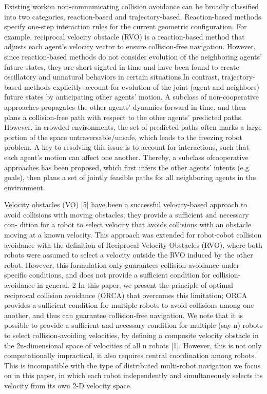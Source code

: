\documentclass[12pt]{report}
\begin{document}
Existing  workon non-communicating collision avoidance can be broadly classified into two categories, reaction-based and trajectory-based.  Reaction-based  methods specify  one-step interaction rules for the current geometric configuration. For example, reciprocal velocity obstacle (RVO) is a reaction-based method that adjusts each  agent’s velocity vector to ensure collision-free navigation. However, since reaction-based methods do not consider evolution of the neighboring agents’ future states, they are short-sighted in time and have been found to create oscillatory and unnatural behaviors in certain situations.In contrast, trajectory-based methods  explicitly account for evolution of the joint (agent and neighbors) future states by  anticipating other agents’ motion. A subclass of non-cooperative approaches propagates the other agents’ dynamics forward in time, and then plans a collision-free path with respect to the other agents’ predicted paths. However, in crowded environments,  the set of predicted paths often marks a large portion of the space untraversable/unsafe, which leads to the freezing robot problem. A key to resolving this issue is to  account for interactions, such that each agent’s motion can affect one another. Thereby, a subclass ofcooperative approaches has been proposed, which first infers the other agents’ intents (e.g. goals), then plans a set of jointly feasible paths for all  neighboring agents in the environment.

Velocity obstacles (VO) [5] have been a successful velocity-based approach to
avoid collisions with moving obstacles; they provide a sufficient and necessary con-
dition for a robot to select velocity that avoids collisions with an obstacle moving at
a known velocity. This approach was extended for robot-robot collision avoidance
with the definition of Reciprocal Velocity Obstacles (RVO), where both
robots were assumed to select a velocity outside the RVO induced by the other robot.
However, this formulation only guarantees collision-avoidance under specific conditions, and does not provide a sufficient condition for collision-avoidance in general. 2 In this paper, we present the principle of optimal reciprocal collision avoidance (ORCA) that overcomes this limitation; ORCA provides a sufficient condition for multiple robots to avoid collisions among one another, and thus can guarantee collision-free navigation.
We note that it is possible to provide a sufficient and necessary condition for
multiple (say n) robots to select collision-avoiding velocities, by defining a composite velocity obstacle in the 2n-dimensional space of velocities of all n robots [1]. However, this is not only computationally impractical, it also requires central coordination among robots. This is incompatible with the type of distributed multi-robot navigation we focus on in this paper, in which each robot independently and simultaneously selects its velocity from its own 2-D velocity space.
\end{document}
